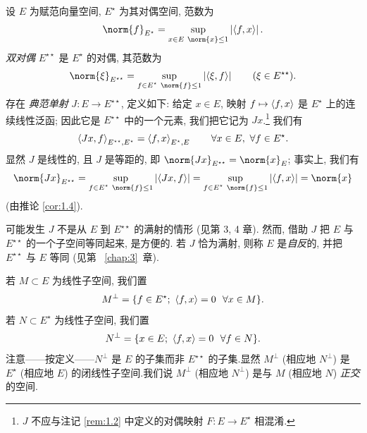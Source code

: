 设 $E$ 为赋范向量空间, $E^\star$ 为其对偶空间, 范数为
\begin{equation*}
\norm{f}_{E^\star}=\sup_{\substack{x\in E\ \norm{x}\le 1}}\abs{\dual{f}{x}}.
\end{equation*}
\emph{双对偶} $E^{\star\star}$ 是 $E^\star$ 的对偶, 其范数为
\begin{equation*}
\norm{\xi}_{E^{\star\star}}=\sup_{\substack{f\in E^\star\ \norm{f}\le 1}}\abs{\dual{\xi}{f}}
\qquad (\xi\in E^{\star\star}).
\end{equation*}
存在\emph{
典范单射} $J:E\to E^{\star\star}$, 定义如下: 给定 $x\in E$, 映射
$f\mapsto\left\langle f,x\right\rangle$ 是 $E^\star$ 上的连续线性泛函; 因此它是 $E^{\star\star}$ 中的一个元素,
我们把它记为 $Jx$.\footnote{$J$ 不应与注记 \ref{rem:1.2} 中定义的对偶映射
$F:E\to E^\star$ 相混淆.} 我们有
\begin{equation*}
\left\langle Jx,f\right\rangle_{E^{\star\star},E^\star}=\left\langle f,x\right\rangle_{E^\star,E}
\qquad \forall x\in E,\ \forall f\in E^\star.
\end{equation*}
显然 $J$ 是线性的, 且 $J$ 是等距的, 即 $\norm{Jx}_{E^{\star\star}}=\norm{x}_{E}$;
事实上, 我们有
\begin{equation*}
\norm{Jx}_{E^{\star\star}}=\sup_{\substack{f\in E^\star\ \norm{f}\le 1}}\abs{\dual{Jx}{f}}
=\sup_{\substack{f\in E^\star\ \norm{f}\le 1}}\abs{\dual{f}{x}}=\norm{x}
\end{equation*}
(由推论  \ref{cor:1.4}).

可能发生 $J$ 不是从 $E$ 到 $E^{\star\star}$ 的满射的情形 (见第 3, 4 章).
然而, 借助 $J$ 把 $E$ 与 $E^{\star\star}$ 的一个子空间等同起来, 是方便的.
若 $J$ 恰为满射, 则称 $E$ 是\emph{自反}的, 并把 $E^{\star\star}$ 与 $E$ 等同 (见第~
\ref{chap:3}~章).

\begin{notation}
若 $M\subset E$ 为线性子空间, 我们置
\begin{equation*}
M^\perp=\{f\in E^\star;\ \left\langle f,x\right\rangle=0\ \ \forall x\in M\}.
\end{equation*}
若 $N\subset E^\star$ 为线性子空间, 我们置
\begin{equation*}
N^\perp=\{x\in E;\ \dual{f}{x}=0\ \ \forall f\in N\}.
\end{equation*}
注意——按定义——$N^\perp$ 是 $E$ 的子集而非 $E^{\star\star}$ 的子集.显然 $M^\perp$
(相应地 $N^\perp$) 是 $E^\star$ (相应地 $E$) 的闭线性子空间.我们说 $M^\perp$
(相应地 $N^\perp$) 是与 $M$ (相应地 $N$) \emph{正交}的空间.
\end{notation}

